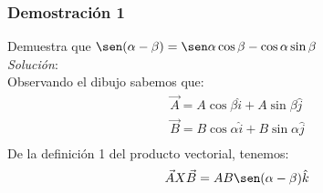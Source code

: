 \documentclass[12pt,openany]{book}
\begin{document}
			\subsubsection{Demostraci\'on 1}
				\noindent Demuestra que $\sen(\alpha-\beta)=\sen\alpha\cos\beta-\cos\alpha\sin\beta$\\
				\noindent\textsl{Soluci\'on}:\\
				Observando el dibujo sabemos que:
				\begin{equation*}
					\begin{split}
						\vec{A}=A\cos\beta\hat{i}+A\sin\beta\hat{j}    \\
						\vec{B}=B\cos\alpha\hat{i}+B\sin\alpha\hat{j}  \\
					\end{split}
				\end{equation*}
				De la definici\'on 1 del producto vectorial, tenemos:\\
				\begin{equation}
					\begin{split}
						\vec{A}X\vec{B}=AB\sen(\alpha-\beta)\hat{k}
					\end{split}
					\label{Def_1}
				\end{equation}
\end{document}
